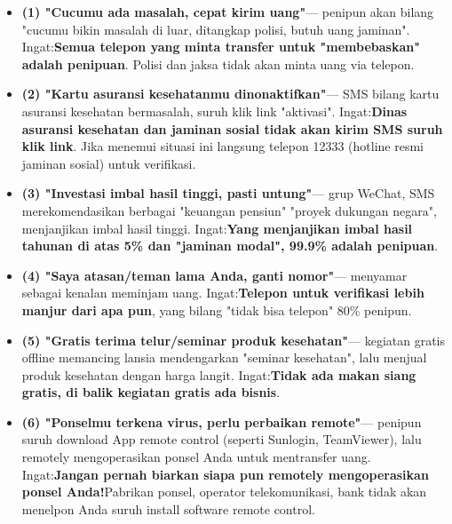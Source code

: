 
\begin{itemize}
  \item \textbf{(1) "Cucumu ada masalah, cepat kirim uang"}— penipun akan bilang "cucumu bikin masalah di luar, ditangkap polisi, butuh uang jaminan". Ingat:\textbf{Semua telepon yang minta transfer untuk "membebaskan" adalah penipuan}. Polisi dan jaksa tidak akan minta uang via telepon.
  \item \textbf{(2) "Kartu asuransi kesehatanmu dinonaktifkan"}— SMS bilang kartu asuransi kesehatan bermasalah, suruh klik link "aktivasi". Ingat:\textbf{Dinas asuransi kesehatan dan jaminan sosial tidak akan kirim SMS suruh klik link}. Jika menemui situasi ini langsung telepon 12333 (hotline resmi jaminan sosial) untuk verifikasi.
  \item \textbf{(3) "Investasi imbal hasil tinggi, pasti untung"}— grup WeChat, SMS merekomendasikan berbagai "keuangan pensiun" "proyek dukungan negara", menjanjikan imbal hasil tinggi. Ingat:\textbf{Yang menjanjikan imbal hasil tahunan di atas 5\% dan "jaminan modal", 99.9\% adalah penipuan}.
  \item \textbf{(4) "Saya atasan/teman lama Anda, ganti nomor"}— menyamar sebagai kenalan meminjam uang. Ingat:\textbf{Telepon untuk verifikasi lebih manjur dari apa pun}, yang bilang "tidak bisa telepon" 80\% penipun.
  \item \textbf{(5) "Gratis terima telur/seminar produk kesehatan"}— kegiatan gratis offline memancing lansia mendengarkan "seminar kesehatan", lalu menjual produk kesehatan dengan harga langit. Ingat:\textbf{Tidak ada makan siang gratis, di balik kegiatan gratis ada bisnis}.
  \item \textbf{(6) "Ponselmu terkena virus, perlu perbaikan remote"}— penipun suruh download App remote control (seperti Sunlogin, TeamViewer), lalu remotely mengoperasikan ponsel Anda untuk mentransfer uang. Ingat:\textbf{Jangan pernah biarkan siapa pun remotely mengoperasikan ponsel Anda!}Pabrikan ponsel, operator telekomunikasi, bank tidak akan menelpon Anda suruh install software remote control.
\end{itemize}



